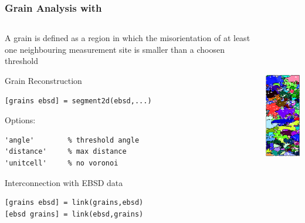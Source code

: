 \begin{frame}[fragile]
  \frametitle{Grain Analysis with \mtex}



  \begin{columns}
    \begin{column}{8.5cm}

      A grain is defined as a region in which the mis\-orien\-tation of
      at least one neigh\-bour\-ing meas\-ure\-ment site is smaller than a choosen threshold

\medskip

      Grain Reconstruction
			
			\begin{lstlisting}
[grains ebsd] = segment2d(ebsd,...)
\end{lstlisting}

      \medskip
      Options:
\begin{lstlisting}
'angle'        % threshold angle
'distance'     % max distance
'unitcell'     % no voronoi
\end{lstlisting}

\medskip


Interconnection with EBSD data
\begin{lstlisting}
[grains ebsd] = link(grains,ebsd)
[ebsd grains] = link(ebsd,grains)
\end{lstlisting}

\end{column}
    \begin{column}{3.5cm}
      \includegraphics[height=7.5cm]{pic/ebsdgrains}
    \end{column}
  \end{columns}

\end{frame}


